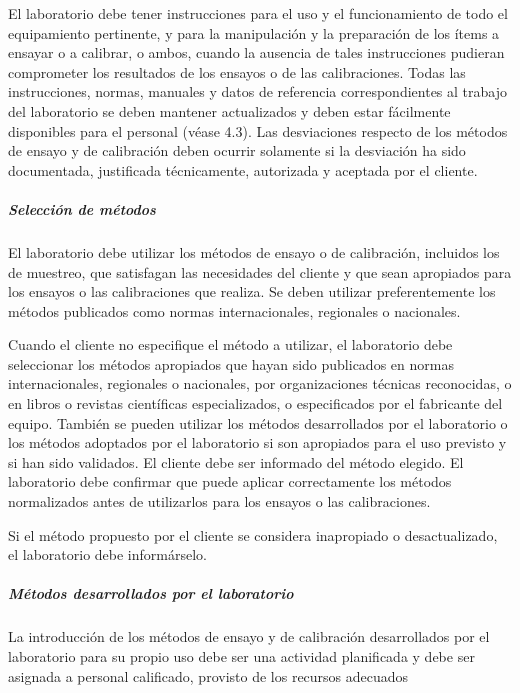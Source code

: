			\par \noindent
				El laboratorio debe tener instrucciones para el uso y el funcionamiento de todo el equipamiento pertinente, y
				para la manipulación y la preparación de los ítems a ensayar o a calibrar, o ambos, cuando la ausencia de
				tales instrucciones pudieran comprometer los resultados de los ensayos o de las calibraciones. Todas las
				instrucciones, normas, manuales y datos de referencia correspondientes al trabajo del laboratorio se deben
				mantener actualizados y deben estar fácilmente disponibles para el personal (véase 4.3). Las desviaciones
				respecto de los métodos de ensayo y de calibración deben ocurrir solamente si la desviación ha sido
				documentada, justificada técnicamente, autorizada y aceptada por el cliente.

\newpage
\thispagestyle{plain}
			
			\subparagraph{Selección de métodos}
				\par 
					El laboratorio debe utilizar los métodos de ensayo o de calibración, incluidos los de muestreo, que satisfagan
					las necesidades del cliente y que sean apropiados para los ensayos o las calibraciones que realiza. Se deben
					utilizar preferentemente los métodos publicados como normas internacionales, regionales o nacionales. 
				
				\par \noindent
					Cuando el cliente no especifique el método a utilizar, el laboratorio debe seleccionar los métodos apropiados que
					hayan sido publicados en normas internacionales, regionales o nacionales, por organizaciones técnicas
					reconocidas, o en libros o revistas científicas especializados, o especificados por el fabricante del equipo. También
					se pueden utilizar los métodos desarrollados por el laboratorio o los métodos adoptados por el laboratorio si son
					apropiados para el uso previsto y si han sido validados. El cliente debe ser informado del método elegido. El
					laboratorio debe confirmar que puede aplicar correctamente los métodos normalizados antes de utilizarlos para los
					ensayos o las calibraciones.
					
				\par \noindent
					Si el método propuesto por el cliente se considera inapropiado o desactualizado, el laboratorio debe
					informárselo.
					
			\subparagraph{Métodos desarrollados por el laboratorio}
				\par 
					La introducción de los métodos de ensayo y de calibración desarrollados por el laboratorio para su propio uso
					debe ser una actividad planificada y debe ser asignada a personal calificado, provisto de los recursos adecuados
				
